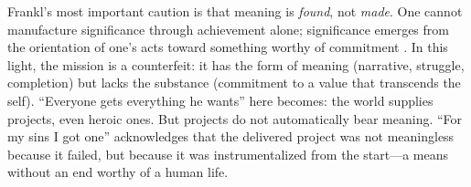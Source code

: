 Frankl's most important caution is that meaning is \emph{found}, not \emph{made}. One cannot
manufacture significance through achievement alone; significance emerges from the orientation
of one's acts toward something worthy of commitment \parencite[pp.~115--121]{FranklMeaning2006}.
In this light, the mission is a counterfeit: it has the form of meaning (narrative, struggle,
completion) but lacks the substance (commitment to a value that transcends the self).
``Everyone gets everything he wants'' here becomes: the world supplies projects, even heroic
ones. But projects do not automatically bear meaning. ``For my sins I got one'' acknowledges
that the delivered project was not meaningless because it failed, but because it was
instrumentalized from the start---a means without an end worthy of a human life.
